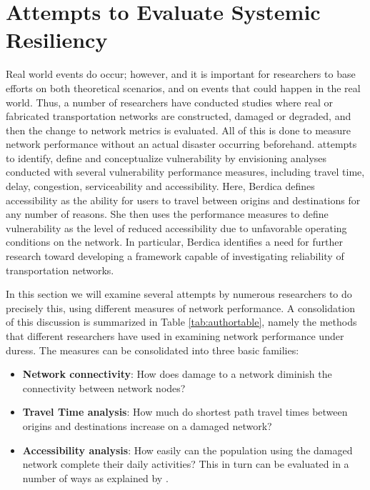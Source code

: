 \section{Attempts to Evaluate Systemic Resiliency}

Real world events do occur; however, and it is important for researchers to
base efforts on both theoretical scenarios, and on events that could happen in
the real world. Thus, a number of researchers have conducted studies where real
or fabricated transportation networks are constructed, damaged or degraded, and
then the change to network metrics is evaluated. All of this is done to measure
network performance without
an actual disaster occurring beforehand.
\citet{berdica2002}
attempts
to identify, define and conceptualize vulnerability by envisioning
analyses conducted with
several vulnerability performance measures, including travel time, delay,
congestion,
serviceability and accessibility. Here, Berdica defines accessibility as
the ability for users to
travel between origins and destinations for any number of reasons. She
then uses the performance
measures to define vulnerability as the level of reduced accessibility due
to unfavorable
operating conditions on the network. In particular, Berdica identifies a
need for further
research toward developing a framework capable of investigating
reliability of transportation
networks.

In this section we will examine several attempts by numerous researchers
to do precisely this,
using different measures of network performance. A consolidation of this
discussion is summarized
in Table \ref{tab:authortable}, namely the methods that different researchers have
used in examining network
performance under duress. The measures can be consolidated into three
basic families:

\begin{itemize}
	\item \textbf{Network connectivity}: How does damage to a network
	diminish the connectivity
between network nodes?
	\item \textbf{Travel Time analysis}: How much do shortest path travel
	times between origins
and destinations increase on a damaged network?
	\item \textbf{Accessibility analysis}: How easily can the population
	using the damaged
network complete their daily activities? This in turn can be evaluated in a number of ways as explained by \citet{dong2006}.
\end{itemize}

